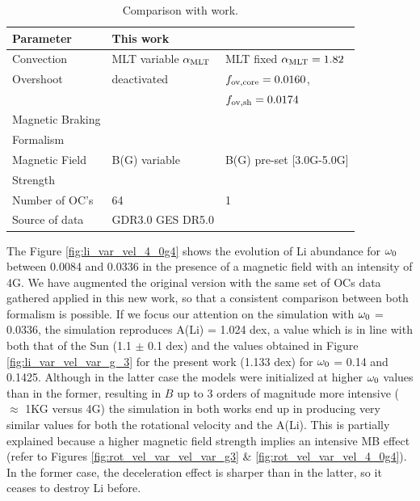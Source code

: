 \documentclass[fleqn,usenatbib]{mnras}
\begin{document}
\begin{table}
	\centering
    \begin{threeparttable}
	\begin{tabular}{lll} 
		\hline
		Parameter & This work & \citet{Caballero2020}\\
		\hline
		Convection & MLT variable $\alpha_{{\rm MLT}}$ & MLT fixed $\alpha_{{\rm MLT}}=1.82$\\
            Overshoot & deactivated & $f_{{\rm ov,core}}=0.0160$,\\ & & $f_{{\rm ov,sh}}=0.0174$\\
		Magnetic Braking & \citet{Gallet2013} & \citet{Ud-Doula2008} \\ Formalism & & \\
		Magnetic Field & B(G) variable & B(G) pre-set [3.0G-5.0G]\\ Strength & & \\
            Number of OC's & 64 & 1 \\
            Source of data & GDR3.0 GES DR5.0 & \citet{Sestito2005} \\
		\hline
	\end{tabular}
    \end{threeparttable}
    \caption{Comparison with \citet{Caballero2020} work.} \label{tab:caballero2023_2020}
\end{table}

The Figure \ref{fig:li_var_vel_4_0g4} shows the evolution of Li abundance for $\omega_{\mathrm{0}}$ between 0.0084 and 0.0336 in the presence of a magnetic field with an intensity of 4G. We have augmented the original version with the same set of OCs data gathered applied in this new work, so that a consistent comparison between both formalism is possible. If we focus our attention on the simulation with $\omega_{\mathrm{0}}$ = 0.0336, the simulation reproduces  A(Li) = 1.024 dex, a value which is in line with both that of the Sun (1.1 $\pm$ 0.1 dex) and the values obtained in Figure \ref{fig:li_var_vel_var_g_3} for the present work (1.133 dex) for $\omega_{\mathrm{0}}$ = 0.14 and 0.1425. Although in the latter case the models were initialized at higher $\omega_{\mathrm{0}}$ values than in the former, resulting in $B$ up to 3 orders of magnitude more intensive ($\approx$ 1KG versus 4G) the simulation in both works end up in producing very similar values for both the rotational velocity and the A(Li). This is partially explained because a higher magnetic field strength implies an intensive MB effect (refer to Figures \ref{fig:rot_vel_var_vel_var_g3} \& \ref{fig:rot_vel_var_vel_4_0g4}). In the former case, the deceleration effect is sharper than in the latter, so it ceases to destroy Li before.\par
\end{document}
